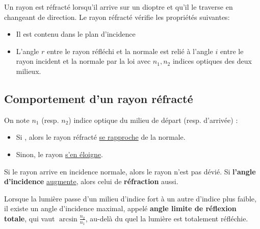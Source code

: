 \documentclass[11pt]{article}
\theoremstyle{cstyle}{\newtheorem{definition}{Définition}[section]}
\theoremstyle{cstyle}{\newtheorem{proposition}[definition]{Propriété}}
\theoremstyle{cstyle}{\newtheorem{theorem}[definition]{Théorème}}
\theoremstyle{mystyle}{\newtheorem{lemma}[definition]{Lemme}}
\theoremstyle{mystyle}{\newtheorem{corollary}[definition]{Corollaire}}
\theoremstyle{mystyle}{\newtheorem*{remark}{Remarque}}
\theoremstyle{mystyle}{\newtheorem*{remarks}{Remarques}}
\theoremstyle{mystyle}{\newtheorem*{example}{Exemple}}
\theoremstyle{mystyle}{\newtheorem*{examples}{Exemples}}
\theoremstyle{definition}{\newtheorem*{exercise}{Exercice}}
\theoremstyle{mystyle}{\newtheorem*{methode}{Méthode}}
\theoremstyle{cstyle}{\newtheorem*{cthm}{}}
\theoremstyle{warn}
\begin{document}
	\begin{minipage}[t]{0.45\textwidth}
		\begin{theorem}
			Un rayon est réfracté lorsqu'il arrive sur un dioptre et qu'il le traverse en changeant de direction.
			Le rayon réfracté vérifie les propriétés suivantes: 
			\begin{itemize}
				\item Il est contenu dans le plan d'incidence
				\item L'angle \(r\) entre le rayon réfléchi et la normale est relié à l'angle \(i\) entre le rayon incident et la normale par la loi  avec \(n_1, n_2\) indices optiques des deux milieux.
			\end{itemize}
		\end{theorem}
	
		\subsection{Comportement d'un rayon réfracté}
		
		\begin{proposition}
			On note \(n_1\) (resp. \(n_2\)) indice optique du milieu de départ (resp. d'arrivée) :
			\begin{itemize}
				\item Si , alors le rayon réfracté \underline{se rapproche} de la normale.
				\item Sinon, le rayon \underline{s'en éloigne}.
			\end{itemize}
		\end{proposition}
	
		\begin{proposition}
			Si le rayon arrive en incidence normale, alors le rayon n'est pas dévié. Si \textbf{l'angle d'incidence} \underline{augmente}, alors celui de \textbf{réfraction} aussi.
		\end{proposition}
	
		\begin{proposition}
			Lorsque la lumière passe d'un milieu d'indice fort à un autre d'indice plus faible, il existe un angle d'incidence maximal, appelé \textbf{angle limite de réflexion totale}, qui vaut \(\arcsin \frac{n_2}{n_1}\), au-delà du quel la lumière est totalement réfléchie.
		\end{proposition}
	\end{minipage}
\end{document}
